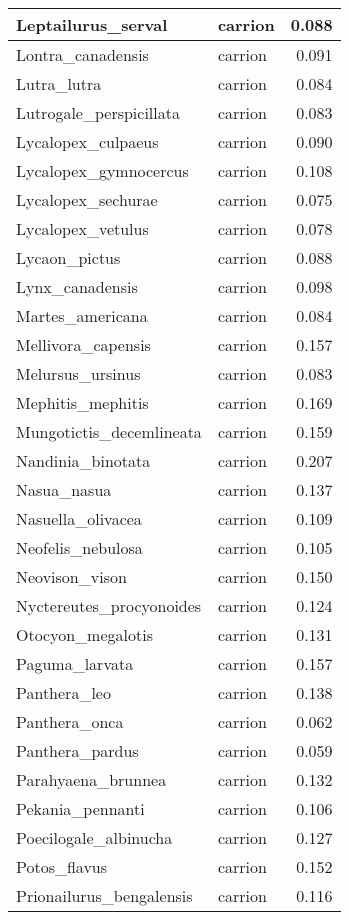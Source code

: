 \begin{table}
\begin{tabular}[t]{l|l|r}
\hline
Leptailurus\_serval & carrion & 0.088\\
\hline
Lontra\_canadensis & carrion & 0.091\\
\hline
Lutra\_lutra & carrion & 0.084\\
\hline
Lutrogale\_perspicillata & carrion & 0.083\\
\hline
Lycalopex\_culpaeus & carrion & 0.090\\
\hline
Lycalopex\_gymnocercus & carrion & 0.108\\
\hline
Lycalopex\_sechurae & carrion & 0.075\\
\hline
Lycalopex\_vetulus & carrion & 0.078\\
\hline
Lycaon\_pictus & carrion & 0.088\\
\hline
Lynx\_canadensis & carrion & 0.098\\
\hline
Martes\_americana & carrion & 0.084\\
\hline
Mellivora\_capensis & carrion & 0.157\\
\hline
Melursus\_ursinus & carrion & 0.083\\
\hline
Mephitis\_mephitis & carrion & 0.169\\
\hline
Mungotictis\_decemlineata & carrion & 0.159\\
\hline
Nandinia\_binotata & carrion & 0.207\\
\hline
Nasua\_nasua & carrion & 0.137\\
\hline
Nasuella\_olivacea & carrion & 0.109\\
\hline
Neofelis\_nebulosa & carrion & 0.105\\
\hline
Neovison\_vison & carrion & 0.150\\
\hline
Nyctereutes\_procyonoides & carrion & 0.124\\
\hline
Otocyon\_megalotis & carrion & 0.131\\
\hline
Paguma\_larvata & carrion & 0.157\\
\hline
Panthera\_leo & carrion & 0.138\\
\hline
Panthera\_onca & carrion & 0.062\\
\hline
Panthera\_pardus & carrion & 0.059\\
\hline
Parahyaena\_brunnea & carrion & 0.132\\
\hline
Pekania\_pennanti & carrion & 0.106\\
\hline
Poecilogale\_albinucha & carrion & 0.127\\
\hline
Potos\_flavus & carrion & 0.152\\
\hline
Prionailurus\_bengalensis & carrion & 0.116\\

\end{tabular}
\end{table}
